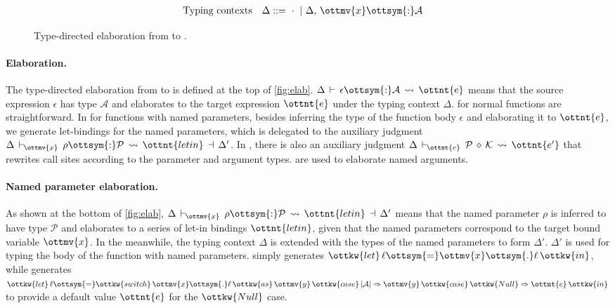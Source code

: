 \begin{figure}
\begin{align*}
  &\text{Typing contexts}&\Delta ::=&~  \cdot  ~|~ \Delta  ,\,  \ottmv{x}  \ottsym{:}  \mathcal{A}
\end{align*}
\IUdefnelab{}
\IUdefnpelab{}
\caption{Type-directed elaboration from \uaena to \lambdaiu.} \label{fig:elab}
\end{figure}

\paragraph{Elaboration.}
The type-directed elaboration from \uaena to \lambdaiu is defined at the top of
\autoref{fig:elab}. $\Delta  \,\vdash\,  \epsilon  \ottsym{:}  \mathcal{A}  \,\rightsquigarrow\,  \ottnt{e}$ means that the source
expression $\epsilon$ has type $\mathcal{A}$ and elaborates to the target expression
$\ottnt{e}$ under the typing context $\Delta$.  for normal
functions are straightforward. In  for functions with named
parameters, besides inferring the type of the function body $\epsilon$ and
elaborating it to $\ottnt{e}$, we generate let-bindings for the named parameters,
which is delegated to the auxiliary judgment $ \Delta \,\vdash\, _{\!\!\!\! \ottmv{x} }\:\: \rho \ottsym{:} \mathcal{P} \,\rightsquigarrow\, \ottnt{letin} \,\dashv\, \Delta' $.
In , there is also an auxiliary judgment $ \Delta \,\vdash\, _{\!\!\!\! \ottnt{e} }\:\: \mathcal{P} \,\diamond\, \mathcal{K} \,\rightsquigarrow\, \ottnt{e'} $
that rewrites call sites according to the parameter and argument types.
 are used to elaborate named arguments.

\paragraph{Named parameter elaboration.}
As shown at the bottom of \autoref{fig:elab},
$ \Delta \,\vdash\, _{\!\!\!\! \ottmv{x} }\:\: \rho \ottsym{:} \mathcal{P} \,\rightsquigarrow\, \ottnt{letin} \,\dashv\, \Delta' $ means that the named parameter
$\rho$ is inferred to have type $\mathcal{P}$ and elaborates to a series of let-in
bindings $\ottnt{letin}$, given that the named parameters correspond to the target
bound variable $\ottmv{x}$. In the meanwhile, the typing context $\Delta$ is extended
with the types of the named parameters to form $\Delta'$. $\Delta'$ is used for
typing the body of the function with named parameters. 
simply generates $\ottkw{let} \, \ell  \ottsym{=}  \ottmv{x}  \ottsym{.}  \ell \, \ottkw{in}$, while  generates
$\ottkw{let} \, \ell  \ottsym{=}  \ottkw{switch} \, \ottmv{x}  \ottsym{.}  \ell \, \ottkw{as} \, \ottmv{y} \, \ottkw{case} \, |  \mathcal{A}  |  \Rightarrow  \ottmv{y} \, \ottkw{case} \, \ottkw{Null}  \Rightarrow  \ottnt{e} \, \ottkw{in}$ to provide a
default value $\ottnt{e}$ for the $\ottkw{Null}$ case.

